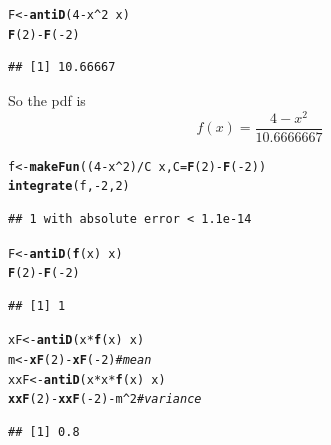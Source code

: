 \documentclass[twoside]{book}\usepackage[]{graphicx}\usepackage[]{xcolor}
\makeatletter
\newcommand{\hlnum}[1]{\textcolor[rgb]{0.686,0.059,0.569}{#1}}%
\newcommand{\hlcom}[1]{\textcolor[rgb]{0.678,0.584,0.686}{\textit{#1}}}%
\newcommand{\hlopt}[1]{\textcolor[rgb]{0,0,0}{#1}}%
\newcommand{\hlstd}[1]{\textcolor[rgb]{0.345,0.345,0.345}{#1}}%
\newcommand{\hlkwb}[1]{\textcolor[rgb]{0.69,0.353,0.396}{#1}}%
\newcommand{\hlkwc}[1]{\textcolor[rgb]{0.333,0.667,0.333}{#1}}%
\newcommand{\hlkwd}[1]{\textcolor[rgb]{0.737,0.353,0.396}{\textbf{#1}}}%
\newenvironment{kframe}{%
 \def\at@end@of@kframe{}%
 \ifinner\ifhmode%
  \def\at@end@of@kframe{\end{minipage}}%
  \begin{minipage}{\columnwidth}%
 \fi\fi%
 \def\FrameCommand##1{\hskip\@totalleftmargin \hskip-\fboxsep
 \colorbox{shadecolor}{##1}\hskip-\fboxsep
     \hskip-\linewidth \hskip-\@totalleftmargin \hskip\columnwidth}%
 \MakeFramed {\advance\hsize-\width
   \@totalleftmargin\z@ \linewidth\hsize
   \@setminipage}}%
 {\par\unskip\endMakeFramed%
 \at@end@of@kframe}
\newenvironment{knitrout}{}{} %
\makeatother
\begin{document}
\begin{solution}
\begin{knitrout}
\color{fgcolor}\begin{kframe}
\begin{alltt}
\hlstd{F} \hlkwb{<-} \hlkwd{antiD}\hlstd{(} \hlnum{4} \hlopt{-} \hlstd{x}\hlopt{^}\hlnum{2} \hlopt{~} \hlstd{x )}
\hlkwd{F}\hlstd{(}\hlnum{2}\hlstd{)} \hlopt{-} \hlkwd{F}\hlstd{(}\hlopt{-}\hlnum{2}\hlstd{)}
\end{alltt}
\begin{verbatim}
## [1] 10.66667
\end{verbatim}
\end{kframe}
\end{knitrout}
	So the pdf is 
	\[
	f(x) = \frac{4 - x^2}{10.6666667}
	\]
\begin{knitrout}
\color{fgcolor}\begin{kframe}
\begin{alltt}
\hlstd{f} \hlkwb{<-} \hlkwd{makeFun}\hlstd{((}\hlnum{4} \hlopt{-} \hlstd{x}\hlopt{^}\hlnum{2}\hlstd{)}\hlopt{/}\hlstd{C} \hlopt{~} \hlstd{x,} \hlkwc{C} \hlstd{=} \hlkwd{F}\hlstd{(}\hlnum{2}\hlstd{)} \hlopt{-} \hlkwd{F}\hlstd{(}\hlopt{-}\hlnum{2}\hlstd{))}
\hlkwd{integrate}\hlstd{(f,} \hlopt{-}\hlnum{2}\hlstd{,} \hlnum{2}\hlstd{)}
\end{alltt}
\begin{verbatim}
## 1 with absolute error < 1.1e-14
\end{verbatim}
\begin{alltt}
\hlstd{F} \hlkwb{<-} \hlkwd{antiD}\hlstd{(}\hlkwd{f}\hlstd{(x)} \hlopt{~} \hlstd{x)}
\hlkwd{F}\hlstd{(}\hlnum{2}\hlstd{)} \hlopt{-} \hlkwd{F}\hlstd{(}\hlopt{-}\hlnum{2}\hlstd{)}
\end{alltt}
\begin{verbatim}
## [1] 1
\end{verbatim}
\begin{alltt}
\hlstd{xF} \hlkwb{<-} \hlkwd{antiD}\hlstd{(x} \hlopt{*} \hlkwd{f}\hlstd{(x)} \hlopt{~} \hlstd{x)}
\hlstd{m} \hlkwb{<-} \hlkwd{xF}\hlstd{(}\hlnum{2}\hlstd{)} \hlopt{-} \hlkwd{xF}\hlstd{(}\hlopt{-}\hlnum{2}\hlstd{)}  \hlcom{# mean}
\hlstd{xxF} \hlkwb{<-} \hlkwd{antiD}\hlstd{(x} \hlopt{*} \hlstd{x} \hlopt{*} \hlkwd{f}\hlstd{(x)} \hlopt{~} \hlstd{x)}
\hlkwd{xxF}\hlstd{(}\hlnum{2}\hlstd{)} \hlopt{-} \hlkwd{xxF}\hlstd{(}\hlopt{-}\hlnum{2}\hlstd{)} \hlopt{-} \hlstd{m}\hlopt{^}\hlnum{2}  \hlcom{# variance}
\end{alltt}
\begin{verbatim}
## [1] 0.8
\end{verbatim}
\end{kframe}
\end{knitrout}
\end{solution}
\end{document}

